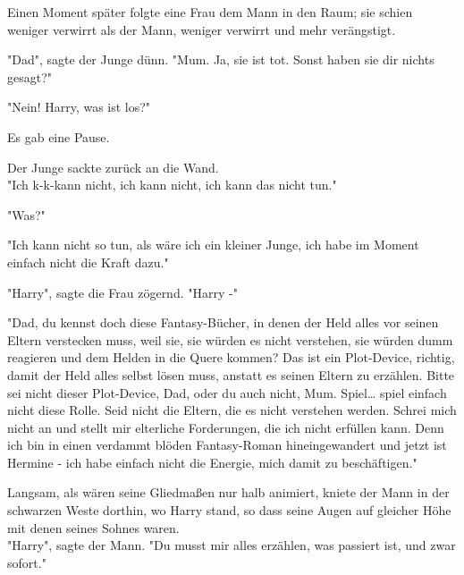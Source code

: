 {Einen Moment später folgte eine Frau dem Mann in den Raum; sie schien weniger verwirrt als der Mann, weniger verwirrt und mehr verängstigt.

"Dad", sagte der Junge dünn. "Mum. Ja, sie ist tot. Sonst haben sie dir nichts gesagt?"

"Nein! Harry, was ist los?"

Es gab eine Pause.

Der Junge sackte zurück an die Wand.\\ "Ich k-k-kann nicht, ich kann nicht, ich kann das nicht tun."

"Was?"

"Ich kann nicht so tun, als wäre ich ein kleiner Junge, ich habe im Moment einfach nicht die Kraft dazu."

"Harry", sagte die Frau zögernd. "Harry -"

"Dad, du kennst doch diese Fantasy-Bücher, in denen der Held alles vor seinen Eltern verstecken muss, weil sie, sie würden es nicht verstehen, sie würden dumm reagieren und dem Helden in die Quere kommen? Das ist ein Plot-Device, richtig, damit der Held alles selbst lösen muss, anstatt es seinen Eltern zu erzählen. Bitte sei nicht dieser Plot-Device, Dad, oder du auch nicht, Mum. Spiel… spiel einfach nicht diese Rolle. Seid nicht die Eltern, die es nicht verstehen werden. Schrei mich nicht an und stellt mir elterliche Forderungen, die ich nicht erfüllen kann. Denn ich bin in einen verdammt blöden Fantasy-Roman hineingewandert und jetzt ist Hermine - ich habe einfach nicht die Energie, mich damit zu beschäftigen."

Langsam, als wären seine Gliedmaßen nur halb animiert, kniete der Mann in der schwarzen Weste dorthin, wo Harry stand, so dass seine Augen auf gleicher Höhe mit denen seines Sohnes waren.\\ "Harry", sagte der Mann. "Du musst mir alles erzählen, was passiert ist, und zwar sofort."

}
